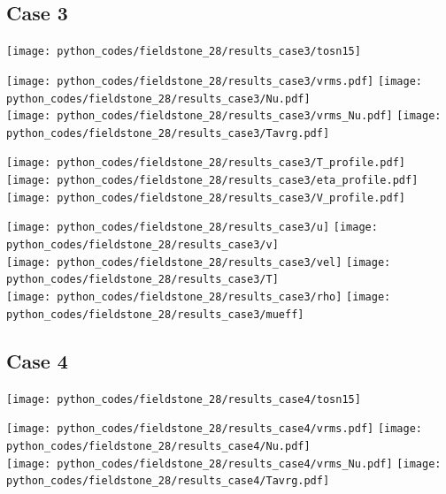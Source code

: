 \newpage %
\subsection*{Case 3}

\texttt{[image: python\_codes/fieldstone\_28/results\_case3/tosn15]}

\begin{center}
\texttt{[image: python\_codes/fieldstone\_28/results\_case3/vrms.pdf]}
\texttt{[image: python\_codes/fieldstone\_28/results\_case3/Nu.pdf]}\\
\texttt{[image: python\_codes/fieldstone\_28/results\_case3/vrms\_Nu.pdf]}
\texttt{[image: python\_codes/fieldstone\_28/results\_case3/Tavrg.pdf]}
\end{center}

\begin{center}
\texttt{[image: python\_codes/fieldstone\_28/results\_case3/T\_profile.pdf]}
\texttt{[image: python\_codes/fieldstone\_28/results\_case3/eta\_profile.pdf]}
\texttt{[image: python\_codes/fieldstone\_28/results\_case3/V\_profile.pdf]}
\end{center}

\newpage
\begin{center}
\texttt{[image: python\_codes/fieldstone\_28/results\_case3/u]}
\texttt{[image: python\_codes/fieldstone\_28/results\_case3/v]}\\
\texttt{[image: python\_codes/fieldstone\_28/results\_case3/vel]}
\texttt{[image: python\_codes/fieldstone\_28/results\_case3/T]}\\
\texttt{[image: python\_codes/fieldstone\_28/results\_case3/rho]}
\texttt{[image: python\_codes/fieldstone\_28/results\_case3/mueff]}
\end{center}




\newpage %
\subsection*{Case 4}

\texttt{[image: python\_codes/fieldstone\_28/results\_case4/tosn15]}

\begin{center}
\texttt{[image: python\_codes/fieldstone\_28/results\_case4/vrms.pdf]}
\texttt{[image: python\_codes/fieldstone\_28/results\_case4/Nu.pdf]}\\
\texttt{[image: python\_codes/fieldstone\_28/results\_case4/vrms\_Nu.pdf]}
\texttt{[image: python\_codes/fieldstone\_28/results\_case4/Tavrg.pdf]}
\end{center}

